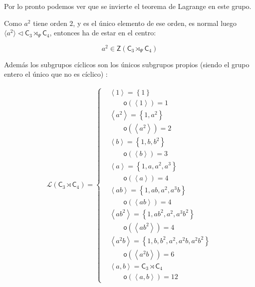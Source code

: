 \documentclass[12pt,a4paper,fleqn,spanish,final,openright]{extbook}
\theoremstyle{definition}
\theoremstyle{remark}
\begin{document}
Por lo pronto podemos ver que se invierte el teorema de Lagrange en este grupo.

Como $a^2$ tiene orden $2$, y es el único elemento de ese orden, es normal luego 
$\langle a^2\rangle\lhd \mathsf{C}_{3}\rtimes_{\Psi} \mathsf{C}_{4}$, 
entonces ha de estar en el centro: 

\[a^2 \in \mathsf{Z}(\mathsf{C}_{3}\rtimes_{\Psi} \mathsf{C}_{4})\]

Además los subgrupos cíclicos son los únicos subgrupos propios (siendo el grupo entero 
el único que no es cíclico) :

\begin{align*}
{\mathcal{L}}\left({{{\mathsf{C}}_{3}}\rtimes{{\mathsf{C}}_{4}}}\right) =
\begin{cases}
&{\left\langle{1}\right\rangle}={\left\lbrace{1}\right\rbrace}\\
&\qquad {\mathsf{o}}{\left({\left\langle{1}\right\rangle}\right)}=1\\
&{\left\langle{a^2}\right\rangle}={\left\lbrace{1,a^2}\right\rbrace}\\
&\qquad {\mathsf{o}}{\left({\left\langle{a^2}\right\rangle}\right)}=2\\
&{\left\langle{b}\right\rangle}={\left\lbrace{1,b,b^2}\right\rbrace}\\
&\qquad {\mathsf{o}}{\left({\left\langle{b}\right\rangle}\right)}=3\\
&{\left\langle{a}\right\rangle}={\left\lbrace{1,a,a^2,a^3}\right\rbrace}\\
&\qquad {\mathsf{o}}{\left({\left\langle{a}\right\rangle}\right)}=4\\
&{\left\langle{a b}\right\rangle}={\left\lbrace{1,ab,a^2,a^3b}\right\rbrace}\\
&\qquad {\mathsf{o}}{\left({\left\langle{a b}\right\rangle}\right)}=4\\
&{\left\langle{a b^2}\right\rangle}={\left\lbrace{1,ab^2,a^2,a^3b^2}\right\rbrace}\\
&\qquad {\mathsf{o}}{\left({\left\langle{a b^2}\right\rangle}\right)}=4\\
&{\left\langle{a^2 b}\right\rangle}={\left\lbrace{1,b,b^2,a^2,a^2b,a^2b^2}\right\rbrace}\\
&\qquad {\mathsf{o}}{\left({\left\langle{a^2 b}\right\rangle}\right)}=6\\
&{\left\langle{a , b}\right\rangle}={{{\mathsf{C}}_{3}}\rtimes{{\mathsf{C}}_{4}}}\\
&\qquad {\mathsf{o}}{\left({\left\langle{a , b}\right\rangle}\right)}=12
\end{cases}
\end{align*}
\end{document}
